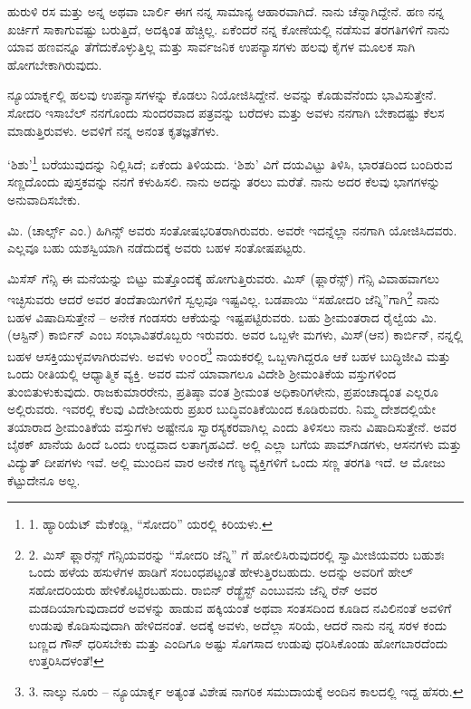 ಹುರುಳಿ ರಸ ಮತ್ತು ಅನ್ನ ಅಥವಾ ಬಾರ್ಲಿ ಈಗ ನನ್ನ ಸಾಮಾನ್ಯ ಆಹಾರವಾಗಿದೆ. ನಾನು ಚೆನ್ನಾಗಿದ್ದೇನೆ. ಹಣ ನನ್ನ ಖರ್ಚಿಗೆ ಸಾಕಾಗುವಷ್ಟು ಬರುತ್ತಿದೆ, ಅದಕ್ಕಿಂತ ಹೆಚ್ಚಿಲ್ಲ. ಏಕೆಂದರೆ ನನ್ನ ಕೋಣೆಯಲ್ಲಿ ನಡೆಸುವ ತರಗತಿಗಳಿಗೆ ನಾನು ಯಾವ ಹಣವನ್ನೂ ತೆಗೆದುಕೊಳ್ಳುತ್ತಿಲ್ಲ ಮತ್ತು ಸಾರ್ವಜನಿಕ ಉಪನ್ಯಾಸಗಳು ಹಲವು ಕೈಗಳ ಮೂಲಕ ಸಾಗಿ ಹೋಗಬೇಕಾಗಿರುವುದು.

ನ್ಯೂಯಾರ್ಕ್ನಲ್ಲಿ ಹಲವು ಉಪನ್ಯಾಸಗಳನ್ನು ಕೊಡಲು ನಿಯೋಜಿಸಿದ್ದೇನೆ. ಅವನ್ನು ಕೊಡುವೆನೆಂದು ಭಾವಿಸುತ್ತೇನೆ. ಸೋದರಿ ಇಸಾಬೆಲ್ ನನಗೊಂದು ಸುಂದರವಾದ ಪತ್ರವನ್ನು ಬರೆದಳು ಮತ್ತು ಅವಳು ನನಗಾಗಿ ಬೇಕಾದಷ್ಟು ಕೆಲಸ ಮಾಡುತ್ತಿರುವಳು. ಅವಳಿಗೆ ನನ್ನ ಅನಂತ ಕೃತಜ್ಞತೆಗಳು.

‘ಶಿಶು’\footnote{1. ಹ್ಯಾರಿಯೆಟ್ ಮೆಕೆಂಡ್ಲಿ, “ಸೋದರಿ” ಯರಲ್ಲಿ ಕಿರಿಯಳು.} ಬರೆಯುವುದನ್ನು ನಿಲ್ಲಿಸಿದೆ; ಏಕೆಂದು ತಿಳಿಯದು. ‘ಶಿಶು’ ವಿಗೆ ದಯವಿಟ್ಟು ತಿಳಿಸಿ, ಭಾರತದಿಂದ ಬಂದಿರುವ ಸಣ್ಣದೊಂದು ಪುಸ್ತಕವನ್ನು ನನಗೆ ಕಳುಹಿಸಲಿ. ನಾನು ಅದನ್ನು ತರಲು ಮರೆತೆ. ನಾನು ಅದರ ಕೆಲವು ಭಾಗಗಳನ್ನು ಅನುವಾದಿಸಬೇಕು.

ಮಿ. (ಚಾರ್ಲ್ಸ್ ಎಂ.) ಹಿಗಿನ್ಸ್ ಅವರು ಸಂತೋಷಭರಿತರಾಗಿರುವರು. ಅವರೇ ಇದನ್ನೆಲ್ಲಾ ನನಗಾಗಿ ಯೋಜಿಸಿದವರು. ಎಲ್ಲವೂ ಬಹು ಯಶಸ್ವಿಯಾಗಿ ನಡೆದುದಕ್ಕೆ ಅವರು ಬಹಳ ಸಂತೋಷಪಟ್ಟರು.

ಮಿಸೆಸ್ ಗೆನ್ಸಿ ಈ ಮನೆಯನ್ನು ಬಿಟ್ಟು ಮತ್ತೊಂದಕ್ಕೆ ಹೋಗುತ್ತಿರುವರು. ಮಿಸ್ (ಫ್ಲಾರೆನ್ಸ್) ಗೆನ್ಸಿ ವಿವಾಹವಾಗಲು ಇಚ್ಛಿಸುವರು ಆದರೆ ಅವರ ತಂದೆತಾಯಿಗಳಿಗೆ ಸ್ವಲ್ಪವೂ ಇಷ್ಟವಿಲ್ಲ. ಬಡಪಾಯಿ “ಸಹೋದರಿ ಜೆನ್ನಿ”ಗಾಗಿ\footnote{2. ಮಿಸ್ ಫ್ಲಾರೆನ್ಸ್ ಗೆನ್ಸಿಯವರನ್ನು “ಸೋದರಿ ಜೆನ್ನಿ” ಗೆ ಹೋಲಿಸಿರುವುದರಲ್ಲಿ ಸ್ವಾಮೀಜಿಯವರು ಬಹುಶಃ ಒಂದು ಹಳೆಯ ಹಸುಳೆಗಳ ಹಾಡಿಗೆ ಸಂಬಂಧಪಟ್ಟಂತೆ ಹೇಳುತ್ತಿರಬಹುದು. ಅದನ್ನು ಅವರಿಗೆ ಹೇಲ್ ಸಹೋದರಿಯರು ಹೇಳಿಕೊಟ್ಟಿರಬಹುದು. ರಾಬಿನ್ ರೆಡ್ಬ್ರೆಸ್ಟ್ ಎಂಬುವನು ಜೆನ್ನಿ ರೆನ್ ಅವರ ಮಡದಿಯಾಗುವುದಾದರೆ ಅವಳನ್ನು ಹಾಡುವ ಹಕ್ಕಿಯಂತೆ ಅಥವಾ ಸಂತಸದಿಂದ ಕೂಡಿದ ನವಿಲಿನಂತೆ ಅವಳಿಗೆ ಉಡುಪು ಕೊಡಿಸುವುದಾಗಿ ಹೇಳಿದನಂತೆ. ಅದಕ್ಕೆ ಅವಳು, ಅದೆಲ್ಲಾ ಸರಿಯೆ, ಆದರೆ ನಾನು ನನ್ನ ಸರಳ ಕಂದು ಬಣ್ಣದ ಗೌನ್ ಧರಿಸಬೇಕು ಮತ್ತು ಎಂದಿಗೂ ಅಷ್ಟು ಸೊಗಸಾದ ಉಡುಪು ಧರಿಸಿಕೊಂಡು ಹೋಗಬಾರದೆಂದು ಉತ್ತರಿಸಿದಳಂತೆ!} ನಾನು ಬಹಳ ವಿಷಾದಿಸುತ್ತೇನೆ – ಅನೇಕ ಗಂಡಸರು ಆಕೆಯನ್ನು ಇಷ್ಟಪಟ್ಟಿರುವರು. ಬಹು ಶ‍್ರೀಮಂತರಾದ ರೈಲ್ವೆಯ ಮಿ. (ಆಸ್ಟಿನ್) ಕಾರ್ಬಿನ್ ಎಂಬ ಸಂಭಾವಿತರೊಬ್ಬರು ಇರುವರು. ಅವರ ಒಬ್ಬಳೇ ಮಗಳು, ಮಿಸ್(ಆನ) ಕಾರ್ಬಿನ್, ನನ್ನಲ್ಲಿ ಬಹಳ ಆಸಕ್ತಿಯುಳ್ಳವಳಾಗಿರುವಳು. ಅವಳು ೪೦೦ರ\footnote{3. ನಾಲ್ಕು ನೂರು – ನ್ಯೂಯಾರ್ಕ್ನ ಅತ್ಯಂತ ವಿಶೇಷ ನಾಗರಿಕ ಸಮುದಾಯಕ್ಕೆ ಅಂದಿನ ಕಾಲದಲ್ಲಿ ಇದ್ದ ಹೆಸರು.} ನಾಯಕರಲ್ಲಿ ಒಬ್ಬಳಾಗಿದ್ದರೂ ಆಕೆ ಬಹಳ ಬುದ್ಧಿಜೀವಿ ಮತ್ತು ಒಂದು ರೀತಿಯಲ್ಲಿ ಆಧ್ಯಾತ್ಮಿಕ ವ್ಯಕ್ತಿ. ಅವರ ಮನೆ ಯಾವಾಗಲೂ ವಿದೇಶಿ ಶ‍್ರೀಮಂತಿಕೆಯ ವಸ್ತುಗಳಿಂದ ತುಂಬಿತುಳುಕುವುದು. ರಾಜಕುಮಾರರೇನು, ಪ್ರತಿಷ್ಠಾ ವಂತ ಶ‍್ರೀಮಂತ ಅಧಿಕಾರಿಗಳೇನು, ಪ್ರಪಂಚಾದ್ಯಂತ ಎಲ್ಲರೂ ಅಲ್ಲಿರುವರು. ಇವರಲ್ಲಿ ಕೆಲವು ವಿದೇಶೀಯರು ಪ್ರಖರ ಬುದ್ಧಿವಂತಿಕೆಯಿಂದ ಕೂಡಿರುವರು. ನಿಮ್ಮ ದೇಶದಲ್ಲಿಯೇ ತಯಾರಾದ ಶ‍್ರೀಮಂತಿಕೆಯ ವಸ್ತುಗಳು ಅಷ್ಟೇನೂ ಸ್ವಾರಸ್ಯಕರವಾಗಿಲ್ಲ ಎಂದು ತಿಳಿಸಲು ನಾನು ವಿಷಾದಿಸುತ್ತೇನೆ. ಅವರ ಬೈಠಕ್ ಖಾನೆಯ ಹಿಂದೆ ಒಂದು ಉದ್ದವಾದ ಲತಾಗೃಹವಿದೆ. ಅಲ್ಲಿ ಎಲ್ಲಾ ಬಗೆಯ ಪಾಮ್​ ಗಿಡಗಳು, ಆಸನಗಳು ಮತ್ತು ವಿದ್ಯುತ್ ದೀಪಗಳು ಇವೆ. ಅಲ್ಲಿ ಮುಂದಿನ ವಾರ ಅನೇಕ ಗಣ್ಯ ವ್ಯಕ್ತಿಗಳಿಗೆ ಒಂದು ಸಣ್ಣ ತರಗತಿ ಇದೆ. ಆ ಮೋಜು ಕೆಟ್ಟುದೇನೂ ಅಲ್ಲ.

